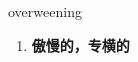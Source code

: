 
\begin{frame}
{\huge overweening}
\begin{center}
\begin{enumerate}\Large
  \item \textbf{傲慢的，专横的}
\end{enumerate}
\end{center}
\end{frame}

